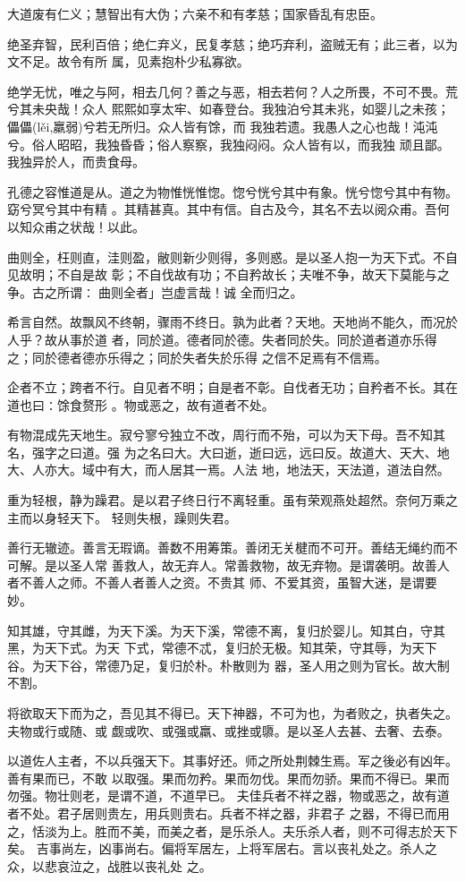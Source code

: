\documentclass[a4paper, twoside, openany, extrafontsizes]{dlutthesis}
\begin{document}
大道废有仁义；慧智出有大伪；六亲不和有孝慈；国家昏乱有忠臣。

绝圣弃智，民利百倍；绝仁弃义，民复孝慈；绝巧弃利，盗贼无有；此三者，以为文不足。故令有所
属，见素抱朴少私寡欲。

绝学无忧，唯之与阿，相去几何？善之与恶，相去若何？人之所畏，不可不畏。荒兮其未央哉！众人
熙熙如享太牢、如春登台。我独泊兮其未兆，如婴儿之未孩；儡儡(lěi,羸弱)兮若无所归。众人皆有馀，而
我独若遗。我愚人之心也哉！沌沌兮。俗人昭昭，我独昏昏；俗人察察，我独闷闷。众人皆有以，而我独
顽且鄙。我独异於人，而贵食母。

孔德之容惟道是从。道之为物惟恍惟惚。惚兮恍兮其中有象。恍兮惚兮其中有物。窈兮冥兮其中有精
。其精甚真。其中有信。自古及今，其名不去以阅众甫。吾何以知众甫之状哉！以此。

曲则全，枉则直，洼则盈，敝则新少则得，多则惑。是以圣人抱一为天下式。不自见故明；不自是故
彰；不自伐故有功；不自矜故长；夫唯不争，故天下莫能与之争。古之所谓∶曲则全者」岂虚言哉！诚
全而归之。

希言自然。故飘风不终朝，骤雨不终日。孰为此者？天地。天地尚不能久，而况於人乎？故从事於道
者，同於道。德者同於德。失者同於失。同於道者道亦乐得之；同於德者德亦乐得之；同於失者失於乐得
之信不足焉有不信焉。

企者不立；跨者不行。自见者不明；自是者不彰。自伐者无功；自矜者不长。其在道也曰∶馀食赘形
。物或恶之，故有道者不处。

有物混成先天地生。寂兮寥兮独立不改，周行而不殆，可以为天下母。吾不知其名，强字之曰道。强
为之名曰大。大曰逝，逝曰远，远曰反。故道大、天大、地大、人亦大。域中有大，而人居其一焉。人法
地，地法天，天法道，道法自然。

重为轻根，静为躁君。是以君子终日行不离轻重。虽有荣观燕处超然。奈何万乘之主而以身轻天下。
轻则失根，躁则失君。

善行无辙迹。善言无瑕谪。善数不用筹策。善闭无关楗而不可开。善结无绳约而不可解。是以圣人常
善救人，故无弃人。常善救物，故无弃物。是谓袭明。故善人者不善人之师。不善人者善人之资。不贵其
师、不爱其资，虽智大迷，是谓要妙。

知其雄，守其雌，为天下溪。为天下溪，常德不离，复归於婴儿。知其白，守其黑，为天下式。为天
下式，常德不忒，复归於无极。知其荣，守其辱，为天下谷。为天下谷，常德乃足，复归於朴。朴散则为
器，圣人用之则为官长。故大制不割。

将欲取天下而为之，吾见其不得已。天下神器，不可为也，为者败之，执者失之。夫物或行或随、或
觑或吹、或强或羸、或挫或隳。是以圣人去甚、去奢、去泰。

以道佐人主者，不以兵强天下。其事好还。师之所处荆棘生焉。军之後必有凶年。善有果而已，不敢
以取强。果而勿矜。果而勿伐。果而勿骄。果而不得已。果而勿强。物壮则老，是谓不道，不道早已。
夫佳兵者不祥之器，物或恶之，故有道者不处。君子居则贵左，用兵则贵右。兵者不祥之器，非君子
之器，不得已而用之，恬淡为上。胜而不美，而美之者，是乐杀人。夫乐杀人者，则不可得志於天下矣。
吉事尚左，凶事尚右。偏将军居左，上将军居右。言以丧礼处之。杀人之众，以悲哀泣之，战胜以丧礼处
之。
\end{document}
